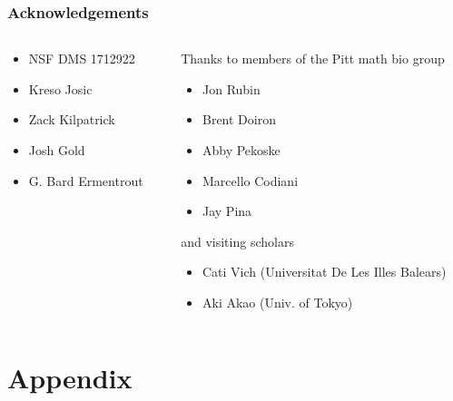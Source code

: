 \documentclass{beamer}
\begin{document}
\begin{frame}[noframenumbering]
 \frametitle{Acknowledgements}
 
 \begin{columns}
\begin{column}{0.5\textwidth}
\begin{itemize}
  \item NSF DMS 1712922
  \item Kreso Josic
 \item Zack Kilpatrick
 \item Josh Gold
 \item G. Bard Ermentrout
  \end{itemize}
  
\end{column}
\begin{column}{0.5\textwidth}  %
 Thanks to members of the Pitt math bio group
 \begin{itemize}
 \item Jon Rubin
 \item Brent Doiron
 \item Abby Pekoske
 \item Marcello Codiani
 \item Jay Pina
  \end{itemize}
  and visiting scholars
 \begin{itemize}
  \item Cati Vich (Universitat De Les Illes Balears)
  \item Aki Akao (Univ. of Tokyo)
 \end{itemize}



\end{column}
\end{columns}
 

\end{frame}



\begin{frame}[allowframebreaks]
 
{}
\end{frame}



\section{Appendix}
\end{document}
